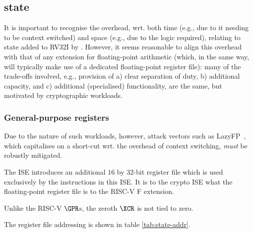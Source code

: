 \subsection{\XCID state}
\label{sec:spec:state}

It is important to recognise 
the overhead, wrt. both 
time (e.g., due to it needing to be context switched) 
and 
space (e.g., due to the logic required),
relating to state added to RV32I by \XCID.
However, it seems reasonable to align this overhead with that of any
extension for floating-point arithmetic (which, in the same way, will
typically make use of a dedicated floating-point register file): many 
of the trade-offs involved, e.g., provision of
a) clear separation of duty,
b) additional capacity,
   and
c) additional (specialised) functionality,
are the same, but motivated by cryptographic workloads.


\subsubsection{General-purpose registers}
\label{sec:spec:state:gpr}

Due to the nature of such workloads, however, attack vectors such as
LazyFP~\cite{SCARV:StePre:18}, which capitalises on a short-cut wrt. 
the overhead of context switching, {\em must} be robustly mitigated.

The ISE introduces an additional $16$ by $32$-bit register file which
is used exclusively by the instructions in this ISE.
It is to the crypto ISE what the floating-point register file is to the
RISC-V F extension.

Unlike the RISC-V $\GPR$s, the zeroth $\XCR$ is not tied to zero.

The register file addressing is shown in table \ref{tab:state-addr}.

